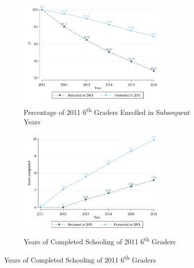 \documentclass[11pt,a4paper]{article}
\begin{document}
\begin{figure}[ht!]
    \caption{6\textsuperscript{th} Grade Retention and Student Attainment}
    \captionsetup[subfigure]{position=top,justification=centering}
    \label{fig:retention_grade6}
    \centering
    
    \begin{subfigure}{\textwidth}
        \caption{Percentage of 2011 6\textsuperscript{th} Graders Enrolled in Subsequent Years}
        \label{fig:retention_grade6_dropout}
        \centering
        \includegraphics[width=0.8\textwidth]{DataWork/Output/Figures/fig5a-retention_grade6_dropout.png}
    \end{subfigure} 
     
    \begin{subfigure}{\textwidth}
        \caption{Years of Completed Schooling of 2011 6\textsuperscript{th} Graders}
        \label{fig:retention_grade6_education}
        \centering
        \includegraphics[width=0.8\textwidth]{DataWork/Output/Figures/fig5b-retention_grade6_education.png}
    \end{subfigure}  
     

\end{figure}
\end{document}
